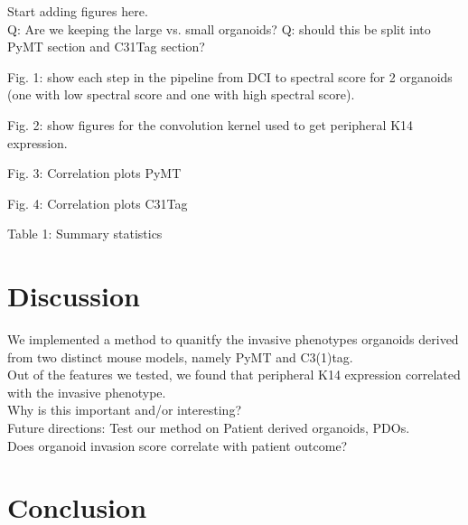 \documentclass[runningheads]{llncs}
\begin{document}
Start adding figures here.\\
Q: Are we keeping the large vs. small organoids?
Q: should this be split into PyMT section and C31Tag section?

Fig. 1: show each step in the pipeline from DCI to spectral score for 2 organoids (one with low spectral score and one with high spectral score).

Fig. 2: show figures for the convolution kernel used to get peripheral K14 expression.

Fig. 3: Correlation plots PyMT

Fig. 4: Correlation plots C31Tag

Table 1: Summary statistics

\section{Discussion}
We implemented a method to quanitfy the invasive phenotypes organoids derived from two distinct mouse models, namely PyMT and C3(1)tag.\\
Out of the features we tested, we found that peripheral K14 expression correlated with the invasive phenotype.\\
Why is this important and/or interesting?\\
Future directions: Test our method on Patient derived organoids, PDOs.\\
Does organoid invasion score correlate with patient outcome?

\section{Conclusion}
\end{document}
